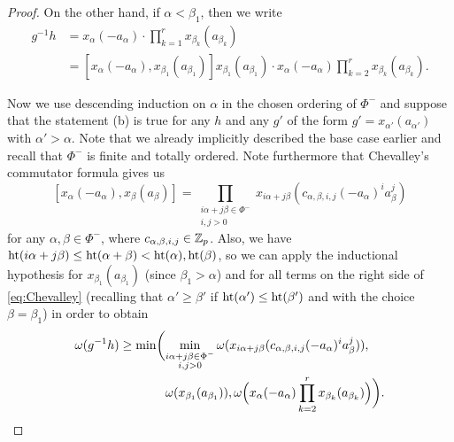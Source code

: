 \begin{proof}
On the other hand, if $\alpha < \beta_1$, then we write
\begin{align*}
  g^{-1}h &= x_\alpha(-a_\alpha) \cdot \prod_{k=1}^r x_{\beta_k}(a_{\beta_k}) \\
  &= [x_\alpha(-a_\alpha),x_{\beta_1}(a_{\beta_1})] x_{\beta_1}(a_{\beta_1}) \cdot x_\alpha(-a_\alpha) \prod_{k=2}^{r}x_{\beta_k}(a_{\beta_k}).
\end{align*}

Now we use descending induction on $\alpha$ in the chosen ordering of $\Phi^{-}$ and suppose that the statement (b) is true for any $h$ and any $g'$ of the form $g' = x_{\alpha'}(a_{\alpha'})$ with $\alpha' > \alpha$. Note that we already implicitly described the base case earlier and recall that $\Phi^{-}$ is finite and totally ordered. Note furthermore that Chevalley's commutator formula gives us
\begin{equation}\label{eq:Chevalley}
  [x_\alpha(-a_\alpha),x_\beta(a_\beta)] = \prod_{\substack{i\alpha + j\beta \in \Phi^{-} \\ i,j>0}} x_{i\alpha + j\beta}(c_{\alpha,\beta,i,j}(-a_\alpha)^{i}a_\beta^{j})
\end{equation}
for any $\alpha,\beta \in \Phi^{-}$, where $c_{\alpha,\beta,i,j} \in \mathbb{Z}_p$. Also, we have $\operatorname{ht}(i\alpha+j\beta) \leq \operatorname{ht}(\alpha+\beta) < \operatorname{ht}(\alpha),\operatorname{ht}(\beta)$, so we can apply the inductional hypothesis for $x_{\beta_1}(a_{\beta_1})$ (since $\beta_1>\alpha$) and for all terms on the right side of \eqref{eq:Chevalley} (recalling that $\alpha' \geq \beta'$ if $\operatorname{ht}(\alpha') \leq \operatorname{ht}(\beta')$ and with the choice $\beta = \beta_1$) in order to obtain
\begin{equation}\label{eq:omega(ginvh)}
  \begin{aligned}
    \omega(g^{-1}h) &\geq \min\biggl( \min_{\substack{i\alpha+j\beta \in \Phi^{-} \\ i,j>0}} \omega(x_{i\alpha + j\beta}(c_{\alpha,\beta,i,j}(-a_\alpha)^{i}a_\beta^{j})), \\*
    &\phantom{{} \geq \min\biggl( {}} \omega(x_{\beta_1}(a_{\beta_1})), \omega\Bigl( x_\alpha(-a_\alpha)\prod_{k=2}^r x_{\beta_k}(a_{\beta_k}) \Bigr) \biggr).
  \end{aligned}
\end{equation}


\end{proof}
